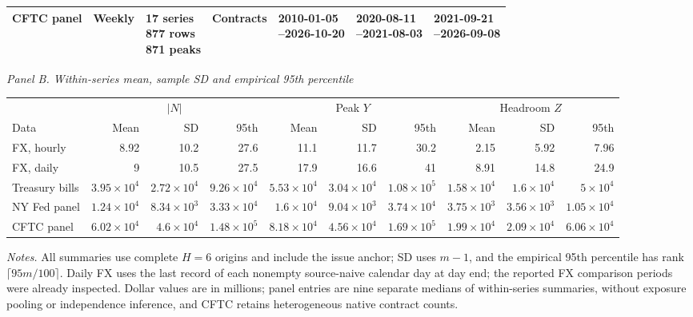 \begin{table}[!htbp]
\begin{tabular}{@{}p{.13\linewidth}p{.08\linewidth}p{.11\linewidth}p{.08\linewidth}p{.15\linewidth}p{.16\linewidth}p{.16\linewidth}@{}}
CFTC panel & Weekly & \shortstack[l]{17 series\\877 rows\\871 peaks} & Contracts & \shortstack[l]{2010-01-05\\--2026-10-20} & \shortstack[l]{2020-08-11\\--2021-08-03} & \shortstack[l]{2021-09-21\\--2026-09-08} \\
\bottomrule
\end{tabular}
\par\vspace{7pt}
\textit{Panel B. Within-series mean, sample SD and empirical 95th percentile}\\[3pt]
\begin{tabular}{@{}l*{9}{r}@{}}
\toprule
 & \multicolumn{3}{c}{$|N|$} & \multicolumn{3}{c}{Peak $Y$} & \multicolumn{3}{c}{Headroom $Z$} \\
\cmidrule(lr){2-4}\cmidrule(lr){5-7}\cmidrule(lr){8-10}
Data & Mean & SD & 95th & Mean & SD & 95th & Mean & SD & 95th \\
\midrule
FX, hourly & 8.92 & 10.2 & 27.6 & 11.1 & 11.7 & 30.2 & 2.15 & 5.92 & 7.96 \\
FX, daily & 9 & 10.5 & 27.5 & 17.9 & 16.6 & 41 & 8.91 & 14.8 & 24.9 \\
Treasury bills & $3.95\!\times\!10^{4}$ & $2.72\!\times\!10^{4}$ & $9.26\!\times\!10^{4}$ & $5.53\!\times\!10^{4}$ & $3.04\!\times\!10^{4}$ & $1.08\!\times\!10^{5}$ & $1.58\!\times\!10^{4}$ & $1.6\!\times\!10^{4}$ & $5\!\times\!10^{4}$ \\
NY Fed panel & $1.24\!\times\!10^{4}$ & $8.34\!\times\!10^{3}$ & $3.33\!\times\!10^{4}$ & $1.6\!\times\!10^{4}$ & $9.04\!\times\!10^{3}$ & $3.74\!\times\!10^{4}$ & $3.75\!\times\!10^{3}$ & $3.56\!\times\!10^{3}$ & $1.05\!\times\!10^{4}$ \\
CFTC panel & $6.02\!\times\!10^{4}$ & $4.6\!\times\!10^{4}$ & $1.48\!\times\!10^{5}$ & $8.18\!\times\!10^{4}$ & $4.56\!\times\!10^{4}$ & $1.69\!\times\!10^{5}$ & $1.99\!\times\!10^{4}$ & $2.09\!\times\!10^{4}$ & $6.06\!\times\!10^{4}$ \\
\bottomrule
\end{tabular}
\endgroup
\begin{minipage}{.98\linewidth}\footnotesize\emph{Notes.} All summaries use complete $H=6$ origins and include the issue anchor; SD uses $m-1$, and the empirical 95th percentile has rank $\lceil95m/100\rceil$. Daily FX uses the last record of each nonempty source-naive calendar day at day end; the reported FX comparison periods were already inspected. Dollar values are in millions; panel entries are nine separate medians of within-series summaries, without exposure pooling or independence inference, and CFTC retains heterogeneous native contract counts.\end{minipage}
\end{table}
